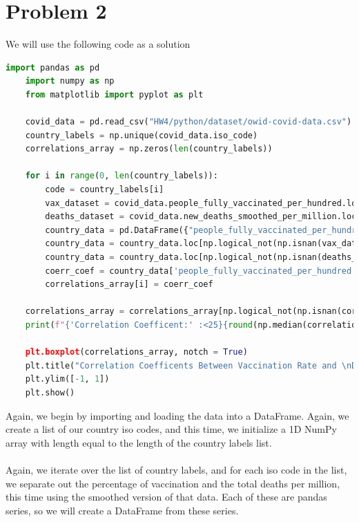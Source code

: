 \documentclass[12pt, letterpaper]{article}
\begin{document}
\newpage
\noindent\makebox[\linewidth]{\rule{18cm}{0.4pt}}
\section*{Problem 2}
We will use the following code as a solution
\begin{lstlisting}[language=python]
    import pandas as pd
    import numpy as np
    from matplotlib import pyplot as plt

    covid_data = pd.read_csv("HW4/python/dataset/owid-covid-data.csv")
    country_labels = np.unique(covid_data.iso_code)
    correlations_array = np.zeros(len(country_labels))

    for i in range(0, len(country_labels)):
        code = country_labels[i]
        vax_dataset = covid_data.people_fully_vaccinated_per_hundred.loc[covid_data.iso_code == code]
        deaths_dataset = covid_data.new_deaths_smoothed_per_million.loc[covid_data.iso_code == code]
        country_data = pd.DataFrame({"people_fully_vaccinated_per_hundred" : vax_dataset, "new_deaths_smoothed_per_million" : deaths_dataset})
        country_data = country_data.loc[np.logical_not(np.isnan(vax_dataset))]
        country_data = country_data.loc[np.logical_not(np.isnan(deaths_dataset))]
        coerr_coef = country_data['people_fully_vaccinated_per_hundred'].corr(country_data['new_deaths_smoothed_per_million'])
        correlations_array[i] = coerr_coef

    correlations_array = correlations_array[np.logical_not(np.isnan(correlations_array))]
    print(f"{'Correlation Coefficent:' :<25}{round(np.median(correlations_array), 3)})

    plt.boxplot(correlations_array, notch = True)
    plt.title("Correlation Coefficents Between Vaccination Rate and \nDeath Rate per Million")
    plt.ylim([-1, 1])
    plt.show()
\end{lstlisting}
Again, we begin by importing and loading the data into a DataFrame. Again, we create a list 
of our country iso codes, and this time, we initialize a 1D NumPy array with length equal to the length 
of the country labels list. \\ \\
Again, we iterate over the list of country labels, and for each iso code in the list, we separate out 
the percentage of vaccination and the total deaths per million, this time using the smoothed version of that 
data. Each of these are pandas series, so we will create a DataFrame from these series. \\ \\
\end{document}
